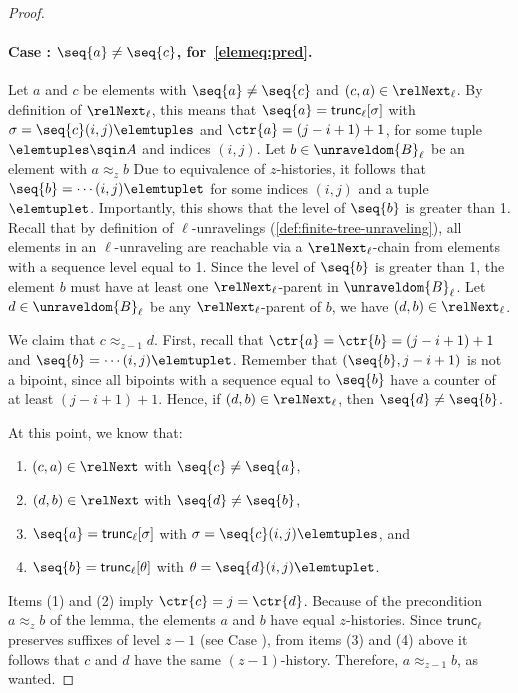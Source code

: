 \begin{proof}
  \paragraph{Case : $\seq{a} \ne \seq{c}$, for~\ref{elemeq:pred}.}
  Let $a$ and $c$ be elements with $\seq{a} \ne \seq{c}$ and $(c,a) \in \relNext_{\ell}$.
  By definition of $\relNext_{\ell}$, this means that $\seq{a} = \mathsf{trunc}_{\ell}[\sigma]$ with $\sigma = \seq{c}(i,j)\elemtuples$ and $\ctr{a} = (j-i+1)+1$, for some tuple $\elemtuples \sqin A$ and indices $(i,j)$.
  Let $b \in \unraveldom{B}_{\ell}$ be an element with $a \approx_{z} b$
  Due to equivalence of $z$-histories, it follows that $\seq{b} = \cdots (i,j) \elemtuplet$ for some indices $(i,j)$ and a tuple $\elemtuplet$.
  Importantly, this shows that the level of $\seq{b}$ is greater than 1.
  Recall that by definition of $\ell$-unravelings (\cref{def:finite-tree-unraveling}), all elements in an $\ell$-unraveling are reachable via a $\relNext_{\ell}$-chain from elements with a sequence level equal to 1.
  Since the level of $\seq{b}$ is greater than 1, the element $b$ must have at least one $\relNext_{\ell}$-parent in $\unraveldom{B}_{\ell}$.
  Let $d \in \unraveldom{B}_{\ell}$ be any $\relNext_{\ell}$-parent of $b$, \ie{} we have $(d,b) \in \relNext_{\ell}$.

  We claim that $c \approx_{z-1} d$.
  First, recall that $\ctr{a} = \ctr{b} = (j-i+1)+1$ and $\seq{b} = \cdots(i,j) \elemtuplet$.
  Remember that $(\seq{b}, j-i+1)$ is not a bipoint, since all bipoints with a sequence equal to $\seq{b}$ have a counter of at least $(j-i+1)+1$.
  Hence, if $(d,b) \in \relNext_{\ell}$, then $\seq{d} \ne \seq{b}$.

  At this point, we know that:
  \begin{enumerate}
    \item $(c,a) \in \relNext$ with $\seq{c} \ne \seq{a}$,
    \item $(d,b) \in \relNext$ with $\seq{d} \ne \seq{b}$,
    \item $\seq{a} = \mathsf{trunc}_{\ell}[\sigma]$ with $\sigma = \seq{c}(i,j)\elemtuples$, and
    \item $\seq{b} = \mathsf{trunc}_{\ell}[\theta]$ with $\theta = \seq{d}(i,j)\elemtuplet$.
  \end{enumerate}
  Items (1) and (2) imply $\ctr{c} = j = \ctr{d}$.
  Because of the precondition $a \approx_{z} b$ of the lemma, the elements $a$ and $b$ have equal $z$-histories.
  Since $\mathsf{trunc}_{\ell}$ preserves suffixes of level $z-1$ (see Case ), from items (3) and (4) above it follows that $c$ and $d$ have the same $(z-1)$-history.
  Therefore, $a \approx_{z-1} b$, as wanted.
\end{proof}
